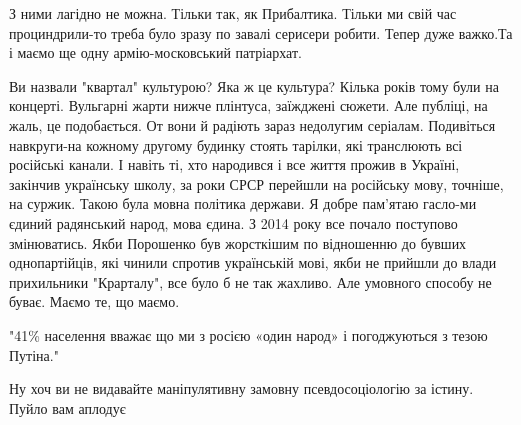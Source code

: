 \begin{itemize}
 
З ними лагідно не можна. Тільки так, як Прибалтика. Тільки ми свій час
проциндрили-то треба було зразу по завалі серисери робити. Тепер дуже важко.Та
і маємо ще одну армію-московський патріархат.

 

Ви назвали "квартал" культурою? Яка ж це культура? Кілька років тому були на
концерті. Вульгарні жарти нижче плінтуса, заїжджені сюжети. Але публіці, на
жаль, це подобається. От вони й радіють зараз недолугим серіалам. Подивіться
навкруги-на кожному другому будинку стоять тарілки, які транслюють всі
російські канали. І навіть ті, хто народився і все життя прожив в Україні,
закінчив українську школу, за роки СРСР перейшли на російську мову, точніше, на
суржик. Такою була мовна політика держави. Я добре пам'ятаю гасло-ми єдиний
радянський народ, мова єдина. З 2014 року все почало поступово змінюватись.
Якби Порошенко був жорсткішим по відношенню до бувших однопартійців, які чинили
спротив українській мові, якби не прийшли до влади прихильники "Крарталу", все
було б не так жахливо. Але умовного способу не буває. Маємо те, що маємо.

 

"41\% населення вважає що ми з росією «один народ» і погоджуються з тезою
Путіна."

Ну хоч ви не видавайте маніпулятивну замовну псевдосоціологію за істину. Пуйло
вам аплодує

\begin{itemize}
 

\end{itemize}
\end{itemize}
